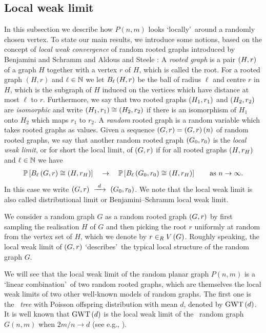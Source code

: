 \subsection{Local weak limit}\label{subsec:results_local}
In this subsection we describe how $P(n,m)$ looks \lq locally\rq\ around a randomly chosen vertex. To state our main results, we introduce some notions, based on the concept of {\em local weak convergence} of random rooted graphs introduced by Benjamini and Schramm \cite{BenjaminiSchramm2001} and Aldous and Steele \cite{AldousSteele2004}: A {\em rooted graph} is a pair $\left(H, r\right)$ of a graph $H$ together with a vertex $r$ of $H$, which is called the root. For a rooted graph $(H,r)$ and $\ell\in\mathbb{N}$ we let $B_{\ell}\left(H, r\right)$ be the ball of radius $\ell$ and centre $r$ in $H$, which is the subgraph of $H$ induced on the vertices which have distance at most $\ell$ to $r$. Furthermore, we say that two rooted graphs $\left(H_1, r_1\right)$ and $\left(H_2, r_2\right)$ are {\em isomorphic} and write $\left(H_1, r_1\right)\cong\left(H_2, r_2\right)$ if there is an isomorphism of $H_1$ onto $H_2$ which maps $r_1$ to $r_2$. A {\em random} rooted graph is a random variable which takes rooted graphs as values. Given a sequence $\left(G, r\right)=\left(G, r\right)(n)$ of random rooted graphs, we say that another random rooted graph $\left(G_0, r_0\right)$ is the {\em local weak limit}, or for short the local limit, of $\left(G, r\right)$ if for all rooted graphs $\left(H, r_H\right)$ and $\ell\in\mathbb{N}$ we have
\begin{align*}
    \mathbb{P}\left[B_{\ell}\left(G, r\right)\cong \left(H, r_H\right)\right]~~~\to~~~\mathbb{P}\left[B_{\ell}\left(G_0, r_0\right)\cong \left(H, r_H\right)\right] \quad\quad \text{as } n\to \infty.
\end{align*}
In this case we write $\left(G, r\right)~\xrightarrow{~d~}~\left(G_0, r_0\right)$. We note that the local weak limit is also called distributional limit or Benjamini–Schramm
local weak limit.

We consider a random graph $G$ as a random rooted graph $\left(G, r\right)$ by first sampling the realisation $H$ of $G$ and then picking the root $r$ uniformly at random from the vertex set of $H$, which we denote by $r \in_R V\left(G\right)$. Roughly speaking, the local weak limit of $\left(G, r\right)$ \lq describes\rq\ the typical local structure of the random graph $G$.

We will see that the local weak limit of the random planar graph $P(n,m)$ is a \lq linear combination\rq\ of two random rooted graphs, which are themselves the local weak limits of two other well-known models of random graphs. The first one is the {\em \GW\ tree} with Poisson offspring distribution with mean $d$, denoted by $\operatorname{GWT}\left(d\right)$. It is well known that $\operatorname{GWT}\left(d\right)$ is the local weak limit of the \ER\ random graph $G(n,m)$ when $2m/n \to d$ (see e.g., \cite{DemboMontanari2010}).

